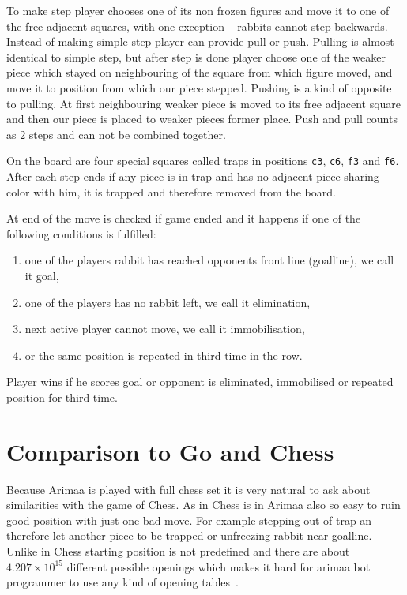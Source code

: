 
To make step player chooses one of its non frozen figures and move it to one of
the free adjacent squares, with one exception -- rabbits cannot step backwards.
Instead of making simple step player can provide pull or push. Pulling is
almost identical to simple step, but after step is done player choose one of
the weaker piece which stayed on neighbouring of the square from which figure
moved, and move it to position from which our piece stepped. Pushing is a kind
of opposite to pulling. At first neighbouring weaker piece is moved to its free
adjacent square and then our piece is placed to weaker pieces former place.
Push and pull counts as 2 steps and can not be combined together.

On the board are four special squares called traps in positions \texttt{c3},
\texttt{c6}, \texttt{f3} and \texttt{f6}. After each step ends if any piece is
in trap and has no adjacent piece sharing color with him, it is trapped and
therefore removed from the board.

At end of the move is checked if game ended and it happens if one of the
following conditions is fulfilled:
\begin{enumerate}
\item one of the players rabbit has reached opponents front line (goalline), we
call it goal,
\item one of the players has no rabbit left, we call it elimination,
\item next active player cannot move, we call it immobilisation,
\item or the same position is repeated in third time in the row.
\end{enumerate}

Player wins if he scores goal or opponent is eliminated, immobilised or
repeated position for third time.


\section{Comparison to Go and Chess}
Because Arimaa is played with full chess set it is very natural to ask about
similarities with the game of Chess. As in Chess is in Arimaa also so easy to
ruin good position with just one bad move. For example stepping out of trap an
therefore let another piece to be trapped or unfreezing rabbit near goalline.
Unlike in Chess starting position is not predefined and there are about
$4.207\times10^{15}$ different possible openings which makes it hard for arimaa
bot programmer to use any kind of opening tables~\cite{COX}.

